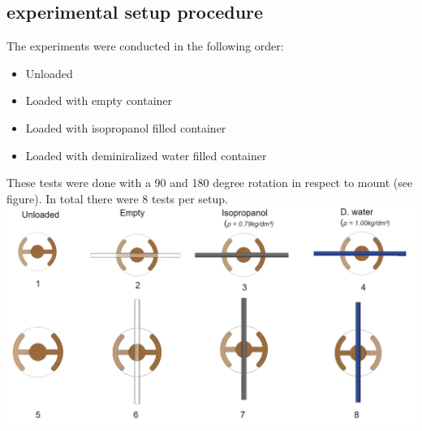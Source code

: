 \documentclass[a4paper, 10pt, conference]{ieeeconf}      %
\begin{document}
    
\subsection{experimental setup procedure}
    The experiments were conducted in the following order:
\begin{itemize}
    \item    Unloaded 
    \item    Loaded with empty container 
    \item    Loaded with isopropanol filled container 
    \item    Loaded with deminiralized water filled container 
\end{itemize}
    These tests were done with a 90 and 180 degree rotation in respect to mount (see figure). In total there were 8 tests per setup.\\
\includegraphics[scale=0.2]{setup.png}


\end{document}
